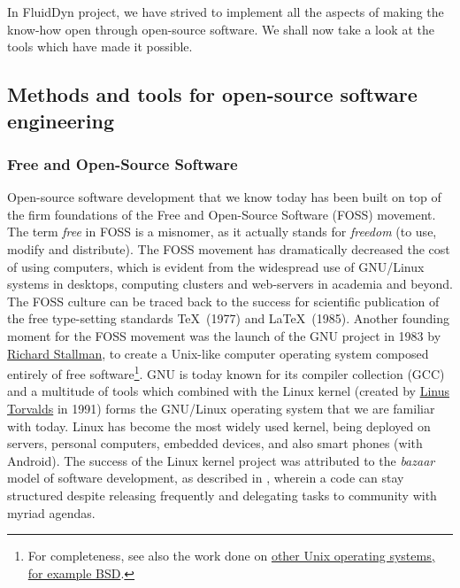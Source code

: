 In FluidDyn project, we have strived to implement all the aspects of making the
know-how open through open-source software. We shall now take a look at the
tools which have made it possible.

\subsection{Methods and tools for open-source software engineering}

\subsubsection{Free and Open-Source Software}

Open-source software development that we know today has been built on top of
the firm foundations of the Free and Open-Source Software (FOSS) movement. The
term \emph{free} in FOSS is a misnomer, as it actually stands for
\emph{freedom} (to use, modify and distribute). The FOSS movement has
dramatically decreased the cost of using computers, which is evident from the
widespread use of GNU/Linux systems in desktops, computing clusters and
web-servers in academia and beyond.
%
The FOSS culture can be traced back to the success for scientific publication
of the free type-setting standards \TeX\ (1977) and \LaTeX\ (1985).
%
Another founding moment for the FOSS movement was the launch of the GNU project
in 1983 by \href{https://en.wikipedia.org/wiki/Richard_Stallman}{Richard
  Stallman}, to create a Unix-like computer operating system composed entirely
  of free software\footnote{For completeness, see also the work done on
  \href{https://www.levenez.com/unix/}{other Unix operating systems, for
example BSD}.}.
%
GNU is today known for its compiler collection (GCC) and a multitude of tools
which combined with the Linux kernel (created by
\href{https://en.wikipedia.org/wiki/Linus_Torvalds}{Linus Torvalds} in 1991)
forms the GNU/Linux operating system
that we are familiar with today.
%
%
Linux has become the most widely used kernel, being deployed on servers,
personal computers, embedded devices, and also smart phones (with Android). The
success of the Linux kernel project was attributed to the \emph{bazaar} model of
software development, as described in \citet{raymond_cathedral_1999}, wherein a
code can stay structured despite releasing frequently and delegating tasks to
community with myriad agendas.

